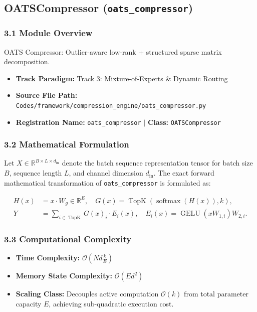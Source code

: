 \subsection{OATSCompressor (\texttt{oats\_compressor})}
\label{sec:app_module_oats\_compressor}

\subsubsection*{3.1 Module Overview}
OATS Compressor: Outlier-aware low-rank + structured sparse matrix decomposition.
\begin{itemize}
    \item \textbf{Track Paradigm:} Track 3: Mixture-of-Experts & Dynamic Routing
    \item \textbf{Source File Path:} \texttt{Codes/framework/compression\_engine/oats\_compressor.py}
    \item \textbf{Registration Name:} \texttt{oats\_compressor} $\mid$ \textbf{Class:} \texttt{OATSCompressor}
\end{itemize}

\subsubsection*{3.2 Mathematical Formulation}
Let $X \in \mathbb{R}^{B \times L \times d_{\text{in}}}$ denote the batch sequence representation tensor for batch size $B$, sequence length $L$, and channel dimension $d_{\text{in}}$. The exact forward mathematical transformation of \texttt{oats\_compressor} is formulated as:

\begin{align}
H(x) &= x \cdot W_g \in \mathbb{R}^{E}, \quad G(x) = \operatorname{TopK}\left(\operatorname{softmax}(H(x)), k\right), \\
Y &= \sum_{i \in \operatorname{TopK}} G(x)_i \cdot E_i(x), \quad E_i(x) = \operatorname{GELU}(x W_{1, i}) W_{2, i}.
\end{align}


\subsubsection*{3.3 Computational Complexity}
\begin{itemize}
    \item \textbf{Time Complexity:} $\mathcal{O}(N d \frac{k}{E})$
    \item \textbf{Memory State Complexity:} $\mathcal{O}(E d^2)$
    \item \textbf{Scaling Class:} Decouples active computation $\mathcal{O}(k)$ from total parameter capacity $E$, achieving sub-quadratic execution cost.
\end{itemize}

